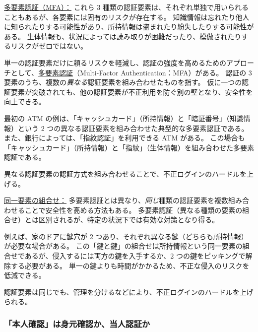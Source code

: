 \documentclass[uplatex]{jsarticle}
\def\label#1{}%
\begin{document}
\underline{多要素認証（MFA）：}
これら 3 種類の認証要素は、それぞれ単独で用いられることもあるが、各要素には固有のリスクが存在する。
知識情報は忘れたり他人に知られたりする可能性があり、所持情報は盗まれたり紛失したりする可能性がある。
生体情報も、状況によっては読み取りが困難だったり、模倣されたりするリスクがゼロではない。

\begin{dfn}[多要素認証]\label{dfn:mfa}
単一の認証要素だけに頼るリスクを軽減し、認証の強度を高めるためのアプローチとして、\underline{多要素認証}（Multi-Factor Authentication：MFA）がある。
認証の 3 要素のうち、複数の\emph{異なる}認証要素を組み合わせたものを指す。
仮に一つの認証要素が突破されても、他の認証要素が不正利用を防ぐ別の壁となり、安全性を向上できる。
\end{dfn}

\begin{exa}\label{exa:ch2-atm-mfa}
最初の ATM の例は、「キャッシュカード」（所持情報）と「暗証番号」（知識情報）という 2 つの異なる認証要素を組み合わせた典型的な多要素認証である。
また、銀行によっては、「指紋認証」を利用できる ATM がある。
この場合も「キャッシュカード」（所持情報）と「指紋」（生体情報）を組み合わせた多要素認証である。
\end{exa}

異なる認証要素の認証方式を組み合わせることで、不正ログインのハードルを上げる。

\underline{同一要素の組合せ：}
多要素認証とは異なり、\emph{同じ}種類の認証要素を複数組み合わせることで安全性を高める方法もある。
多要素認証（異なる種類の要素の組合せ）とは区別されるが、特定の状況下では有効な対策となり得る。

\begin{exa}[2 つの鍵穴のあるドア]\label{exa:ch2-two-keys}
例えば、家のドアに鍵穴が 2 つあり、それぞれ異なる鍵（どちらも所持情報）が必要な場合がある。
この「鍵と鍵」の組合せは所持情報という同一要素の組合せであるが、侵入するには両方の鍵を入手するか、2 つの鍵をピッキングで解除する必要がある。
単一の鍵よりも時間がかかるため、不正な侵入のリスクを低減できる。
\end{exa}

\begin{rem}[同一要素の組合せでもハードルは上がる]\label{rem:ch2-same-factor}
認証要素は同じでも、管理を分けるなどにより、不正ログインのハードルを上げられる。
\end{rem}

\subsubsection{「本人確認」は身元確認か、当人認証か}
\end{document}
